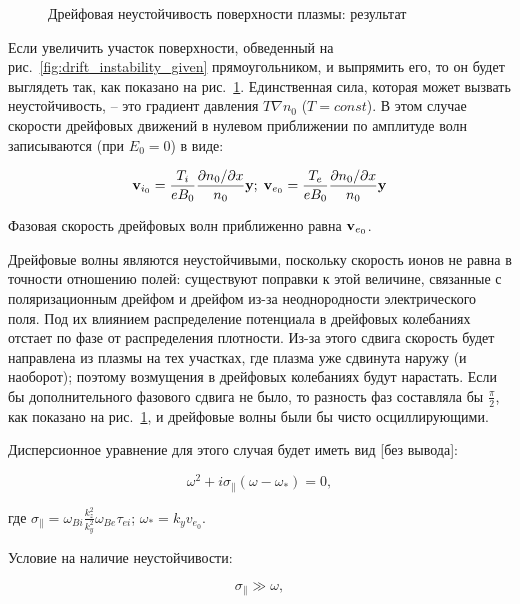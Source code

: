 \documentclass[10pt, a4paper]{article}
\begin{document}
\begin{itemize}
\begin{itemize}
\begin{figure}[ht]
\begin{center}
\begin{minipage}[ht]{0.49\linewidth}
					\caption{Дрейфовая неустойчивость поверхности плазмы: результат~\cite{chen}}
					\label{fig:drift_instability_result}
				\end{minipage}
			\end{center}
		\end{figure}
		
		Если увеличить участок поверхности, обведенный на рис.~\ref{fig:drift_instability_given} прямоугольником, и выпрямить его, то он будет выглядеть так, как показано на рис.~\ref{fig:drift_instability_result}. Единственная сила, которая может вызвать неустойчивость, -- это градиент давления $T\nabla n_0$ ($T=const$). В этом случае скорости дрейфовых движений в нулевом приближении по амплитуде волн записываются (при $E_0 = 0$) в виде:
		
		\begin{equation*}
			\vb{v}_{i_0} = \frac{T_i}{eB_0}\frac{\partial n_0/\partial x}{n_0}\vb{y};\;\vb{v}_{e_0} = \frac{T_e}{eB_0}\frac{\partial n_0/\partial x}{n_0}\vb{y}
		\end{equation*}
	
	 	Фазовая скорость дрейфовых волн приближенно равна $\vb{v}_{e_0}$. 
	 	
		Дрейфовые волны являются неустойчивыми, поскольку скорость ионов не равна в точности отношению полей: существуют поправки к этой величине, связанные с поляризационным дрейфом и дрейфом из-за неоднородности электрического поля. Под их влиянием распределение потенциала в дрейфовых колебаниях отстает по фазе от распределения плотности. Из-за этого сдвига скорость будет направлена из плазмы на тех участках, где плазма уже сдвинута наружу (и наоборот); поэтому возмущения в дрейфовых колебаниях будут нарастать. Если бы дополнительного фазового сдвига не было, то разность фаз составляла бы $\frac{\pi}{2}$, как показано на рис.~\ref{fig:drift_instability_result}, и дрейфовые волны были бы чисто осциллирующими.
		
		Дисперсионное уравнение для этого случая будет иметь вид [без вывода]:
		
		\begin{equation*}
			\omega^2+i\sigma_\parallel(\omega-\omega_{*})=0,
		\end{equation*}	
		
		где $\sigma_\parallel = \omega_{Bi}\frac{k_z^2}{k_y^2}\omega_{Be}\tau_{ei}$; $\omega_{*} = k_yv_{e_0}$.
		
		Условие на наличие неустойчивости:
		
		\begin{equation*}
			\sigma_\parallel \gg \omega,
		\end{equation*}
		

\end{itemize}
\end{itemize}
\end{document}
